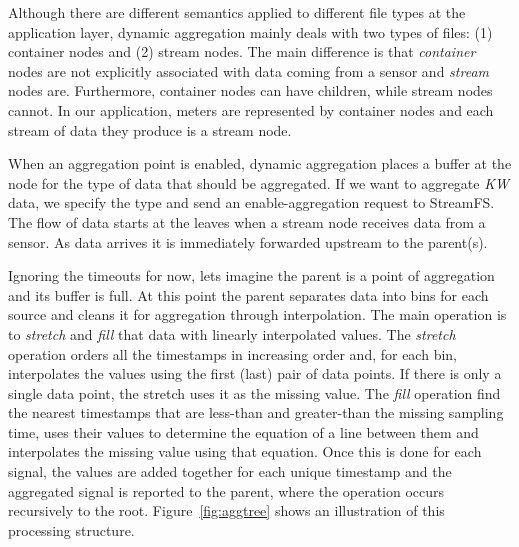 Although there are different semantics applied to different file types at the application layer, dynamic aggregation
mainly deals with two types of files: (1) container nodes and (2) stream nodes.  The main difference is that \emph{container} nodes
are not explicitly associated with data coming from a sensor and \emph{stream} nodes are.  Furthermore, container
nodes can have children, while stream nodes cannot.  In our application, meters are represented by container nodes
and each stream of data they produce is a stream node.

When an aggregation point is enabled, dynamic aggregation places a buffer at the node for the type
of data that should be aggregated.  
If we want to aggregate \emph{KW} data, we specify the type and send an enable-aggregation
request to StreamFS.
The flow of data starts at the leaves when
a stream node receives data from a sensor.%
As data arrives it is immediately
forwarded upstream to the parent(s).  

Ignoring the timeouts for now, lets imagine the parent is a point of aggregation and its buffer is full.  At this point
the parent separates data into bins for each source and cleans it for aggregation through interpolation.  The main
operation is to \emph{stretch} and \emph{fill} that data with linearly interpolated values.  The \emph{stretch}
operation orders all the timestamps in increasing order and, for each bin, interpolates the values using the
first (last) pair of data points.  If there is only a single data point, the stretch uses it as the missing value.
The \emph{fill} operation find the nearest timestamps that are less-than and greater-than the missing sampling time, 
uses their values to determine the equation of a line between them and interpolates the missing value using that equation.
Once this is done for each signal, the values are added together for each unique timestamp and the aggregated
signal is reported to the parent, where the operation occurs recursively to the root.
Figure~\ref{fig:aggtree} shows an illustration of this processing structure.




